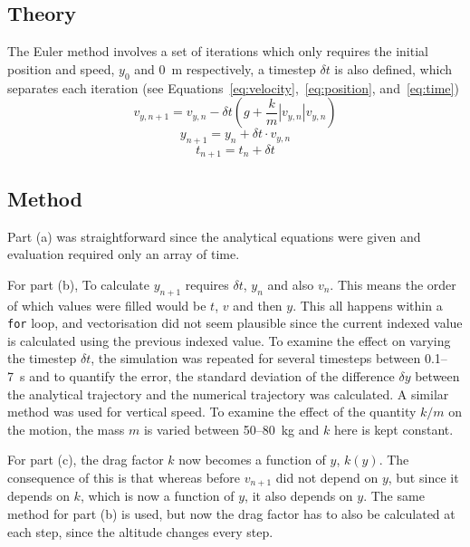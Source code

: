 \documentclass[hyphens,twocolumn,nobalancelastpage,aps,10pt,citeautoscript,longbibliography]{revtex4-2}
\begin{document}
\subsection{Theory}%
\label{sub:theory_1}

\noindent The Euler method involves a set of iterations which only requires the
initial position and speed, $y_0$ and \qty{0}{\metre} respectively, a timestep
$\delta t$ is also defined, which separates each iteration (see
Equations~\ref{eq:velocity},~\ref{eq:position}, and~\ref{eq:time})
\begin{equation}
	\label{eq:velocity}%
	v_{y,n+1} = v_{y,n} - \delta t \left(g + \frac{k}{m}|v_{y,n}| v_{y,n}\right)
\end{equation}
\begin{equation}
	\label{eq:position}%
	y_{n+1} = y_n + \delta t \cdot v_{y,n}
\end{equation}
\begin{equation}
	\label{eq:time}%
	t_{n+1} = t_n + \delta t
\end{equation}

\subsection{Method}%
\label{sub:method_1}

\noindent Part (a) was straightforward since the analytical equations were
given and evaluation required only an array of time.

For part (b), To calculate $y_{n+1}$ requires $\delta t$, $y_{n}$ and also
$v_{n}$. This means the order of which values were filled would be $t$, $v$ and
then $y$. This all happens within a \lstinline{for} loop, and vectorisation did
not seem plausible since the current indexed value is calculated using the
previous indexed value. To examine the effect on varying the timestep $\delta
	t$, the simulation was repeated for several timesteps between
0.1--\qty{7}{\second} and to quantify the error, the standard deviation of the
difference $\delta y$ between the analytical trajectory and the numerical
trajectory was calculated. A similar method was used for vertical speed. To
examine the effect of the quantity $k/m$ on the motion, the mass $m$ is varied
between 50--\qty{80}{\kilogram} and $k$ here is kept constant.

For part (c), the drag factor $k$ now becomes a function of $y$, $k(y)$. The
consequence of this is that whereas before $v_{n+1}$ did not depend on $y$, but
since it depends on $k$, which is now a function of $y$, it also depends on
$y$. The same method for part (b) is used, but now the drag factor has to also
be calculated at each step, since the altitude changes every step.
\end{document}
